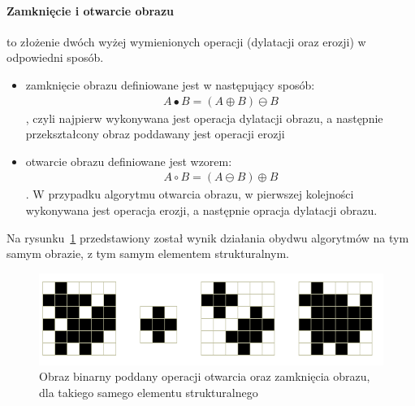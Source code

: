 \paragraph {Zamknięcie i otwarcie obrazu} to złożenie dwóch wyżej wymienionych operacji (dylatacji oraz erozji) w odpowiedni sposób.
\begin{itemize}
\item zamknięcie obrazu definiowane jest w następujący sposób:
  \begin{gather*}
    A \bullet B = (A \oplus B) \ominus B
  \end{gather*}, czyli najpierw wykonywana jest operacja dylatacji obrazu, a następnie przekształcony obraz poddawany jest operacji erozji
\item otwarcie obrazu definiowane jest wzorem:
  \begin{gather*}
    A \circ B = (A \ominus B) \oplus B
  \end{gather*}. W przypadku algorytmu otwarcia obrazu, w pierwszej kolejności wykonywana jest operacja erozji, a następnie opracja dylatacji obrazu.
\end{itemize}
Na rysunku~\ref{fig:open_close} przedstawiony został wynik działania obydwu algorytmów na tym samym obrazie, z tym samym elementem strukturalnym.
\begin{figure}
  \centering
  \includegraphics[width=15cm]{img/open-close}
  \caption{Obraz binarny poddany operacji otwarcia oraz zamknięcia obrazu, dla takiego samego elementu strukturalnego}
  \label{fig:open_close}
\end{figure}
